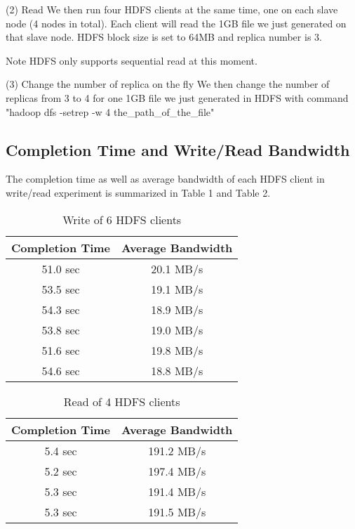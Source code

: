 (2) Read
We then run four HDFS clients at the same time, one on each slave node (4 nodes in total). Each client will read the 1GB file we just generated on that slave node. HDFS block size is set to 64MB and replica number is 3.

Note HDFS only supports sequential read at this moment.

(3) Change the number of replica on the fly
We then change the number of replicas from 3 to 4 for one 1GB file we just generated in HDFS with command "hadoop dfs -setrep -w 4 the\_path\_of\_the\_file"

\subsection{\bf Completion Time and Write/Read Bandwidth}

The completion time as well as average bandwidth of each HDFS client in write/read experiment is summarized in Table 1 and Table 2.

\begin{table}
\centering
\begin{tabular}{|c|c|} \hline
Completion Time & Average Bandwidth\\ \hline
51.0 sec & 20.1 MB/s\\ \hline
53.5 sec & 19.1 MB/s\\ \hline
54.3 sec & 18.9 MB/s\\ \hline
53.8 sec & 19.0 MB/s\\ \hline
51.6 sec & 19.8 MB/s\\ \hline
54.6 sec & 18.8 MB/s\\ \hline
\end{tabular}\label{t1}
\caption{Write of 6 HDFS clients}
\end{table}

\begin{table}
\centering
\begin{tabular}{|c|c|} \hline
Completion Time & Average Bandwidth\\ \hline
5.4 sec & 191.2 MB/s\\ \hline
5.2 sec & 197.4 MB/s\\ \hline
5.3 sec & 191.4 MB/s\\ \hline
5.3 sec & 191.5 MB/s\\ \hline
\end{tabular}\label{t1}
\caption{Read of 4 HDFS clients}
\end{table}



